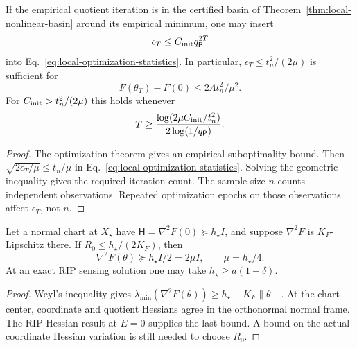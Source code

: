 \begin{corollary}
If the empirical quotient iteration is in the certified basin of
Theorem~\ref{thm:local-nonlinear-basin} around its empirical minimum,
one may insert
\begin{equation}
\epsilon_T\leq C_{\rm init}q_{\mathsf P}^{2T}
\end{equation}
into Eq.~\eqref{eq:local-optimization-statistics}.
In particular, $\epsilon_T\leq t_n^2/(2\mu)$ is sufficient for
\begin{equation}
F(\theta_T)-F(0)\leq 2\Lambda t_n^2/\mu^2 .
\end{equation}
For $C_{\rm init}>t_n^2/(2\mu)$ this holds whenever
\begin{equation}
T\geq
\frac{\log(2\mu C_{\rm init}/t_n^2)}
{2\log(1/q_{\mathsf P})}.
\label{eq:local-statistical-stopping}
\end{equation}
\end{corollary}
\begin{proof}
The optimization theorem gives an empirical suboptimality bound.
Then $\sqrt{2\epsilon_T/\mu}\leq t_n/\mu$ in
Eq.~\eqref{eq:local-optimization-statistics}. Solving the geometric
inequality gives the required iteration count.
The sample size $n$ counts independent observations. Repeated
optimization epochs on those observations affect $\epsilon_T$,
not $n$.
\end{proof}

\begin{proposition}
Let a normal chart at $X_\star$ have
$\mathsf H=\nabla^2F(0)\succeq h_\star I$, and suppose
$\nabla^2F$ is $K_F$-Lipschitz there. If
$R_0\leq h_\star/(2K_F)$, then
\begin{equation}
\nabla^2F(\theta)\succeq h_\star I/2=2\mu I,
\qquad \mu=h_\star/4 .
\end{equation}
At an exact RIP sensing solution one may take
$h_\star\geq a(1-\delta)$.
\end{proposition}
\begin{proof}
Weyl's inequality gives
$\lambda_{\min}(\nabla^2F(\theta))
\geq h_\star-K_F\|\theta\|$.
At the chart center, coordinate and quotient Hessians agree in the
orthonormal normal frame. The RIP Hessian result at $E=0$ supplies
the last bound. A bound on the actual coordinate Hessian variation
is still needed to choose $R_0$.
\end{proof}

